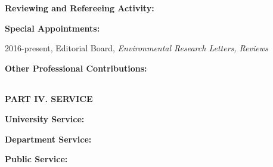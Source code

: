 \documentclass[10pt]{article}
\begin{document}
\vspace{0.5cm}
\textbf{Reviewing and Refereeing Activity:}
\vspace{0.2cm}


\vspace{0.25cm}
\textbf{Special Appointments:}

\hspace{0.5cm} 2016-present, Editorial Board, \textit{Environmental Research Letters, Reviews}

\vspace{0.25cm}
\textbf{Other Professional Contributions:}
\hspace{0.5cm}
\begin{tabular}{lp{2cm}p{12cm}}
\end{tabular}


\vspace{0.5cm}
\textbf{PART IV.  SERVICE}

\vspace{0.5cm}
\textbf{University Service:}
\vspace{0.2cm}


\vspace{0.5cm}
\textbf{Department Service:}
\vspace{0.2cm}


\vspace{0.5cm}
\textbf{Public Service:}
\vspace{0.2cm}

\end{document}
